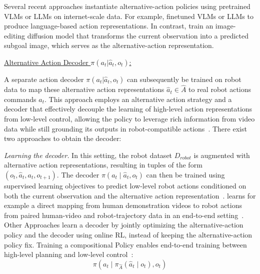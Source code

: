 Several recent approaches instantiate alternative-action policies using pretrained \acp{VLM} or \acp{LLM} on internet-scale data. For example, \textcite{Yang2023LearningIR,Du2023VideoLP,Mu2023EmbodiedGPTVP} finetuned VLMs or LLMs to produce language-based action representations. In contrast, \textcite{Black2023ZeroShotRM} train an image-editing diffusion model that transforms the current observation into a predicted subgoal image, which serves as the alternative-action representation.




\underline{Alternative Action Decoder $\pi(a_t|\hat{a}_t, o_t)$:}
\label{sec:AlternativeActionDecoder}

A separate action decoder $\pi(a_t|\hat{a}_t, o_t)$ can subsequently be trained on robot data to map these alternative action representations $\hat{a}_t \in \hat{A}$ to real robot actions commands $a_t$. This approach employs an alternative action strategy and a decoder that effectively decouple the learning of high-level action representations from low-level control, allowing the policy to leverage rich information from video data while still grounding its outputs in robot-compatible actions~\cite{Schmidt2023LearningTA, Du2023LearningUP, Wen2023AnypointTM}.
There exist two approaches to obtain the decoder:

\textit{Learning the decoder.}
In this setting, the robot dataset $D_{robot}$ is augmented with alternative action representations, resulting in tuples of the form $(o_t, \hat{a}_t, a_t, o_{t+1})$. The decoder $\pi(a_t \mid \hat{a}_t, o_t)$ can then be trained using supervised learning objectives to predict low-level robot actions conditioned on both the current observation and the alternative action representation~\cite{McCarthy_2025, Schmidt2023LearningTA, Bruce2024GenieGI, Wang2023MimicPlayLI, Wen2023AnypointTM, Du2023LearningUP, Black2023ZeroShotRM}. 
\textcite{Jain2024Vid2RobotEV} learns for example a direct mapping from human demonstration videos to robot actions from paired human-video and robot-trajectory data in an end-to-end setting~\cite{Jain2024Vid2RobotEV}. Other Approaches learn a decoder by jointly optimizing the alternative-action policy and the decoder using online \ac{RL}, instead of keeping the alternative-action policy fix. Training a compositional Policy enables end-to-end training between high-level planning and low-level control~\cite{Schmidt2023LearningTA}:  
    \begin{equation}
    \pi(a_t \mid \pi_{\hat{A}}(\hat{a}_t \mid o_t), o_t)
    \end{equation}


